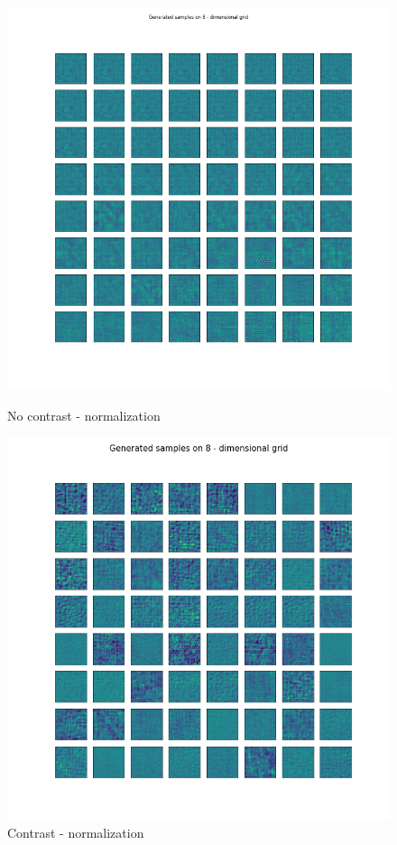\documentclass[12pt, english]{article}
\begin{document}
\begin{figure}[H]
\begin{minipage}{0.5\linewidth}
    \centering
    \includegraphics[width=.75\linewidth]{lvae2/18_DenseLadderVAE_contrastNorm-generated_samples.png} 
    \caption{No contrast - normalization} 
    \label{fig:lvae-2-contrast-generated-3} 
  \end{minipage}%
  \begin{minipage}{0.5\linewidth}
    \centering
    \includegraphics[width=.75\linewidth]{lvae2/19_DenseLadderVAE_contrastNorm_contrast-generated_samples.png} 
    \caption{Contrast - normalization} 
    \label{fig:lvae-2-contrast-generated-4} 
  \end{minipage} 
\end{figure}

\vspace{4mm}
\end{document}
